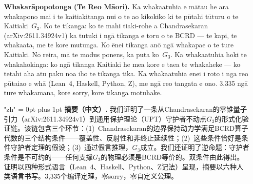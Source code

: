\documentclass[11pt,a4paper]{article}
\newenvironment{zhtext}{%
  \cjkfont
  \XeTeXlinebreaklocale "zh"%
  \XeTeXlinebreakskip = 0pt plus 1pt%
}{}
\theoremstyle{definition}
\theoremstyle{remark}
\begin{document}
\begin{center}
\parbox{0.85\textwidth}{\small\textbf{Whakar\={a}popotonga (Te Reo M\={a}ori).}
Ka whakaatuhia e m\={a}tau he ara whakapono mai i te kaitiakitanga nui o te ao kikokiko ki te p\={u}tahi t\={u}turu o te Kaitiaki~$G_3$. Ko te tikanga: ko te mahi tiaki-rohe a Chandrasekaran (arXiv:2611.34924v1) ka tutuki i ng\={a} tikanga e toru o te BCRD --- te kapi, te whakaata, me te kore mutunga. Ko \={e}nei tikanga an\={o} ng\={a} whakapae o te ture Kaitiaki. N\={o} reira, m\={a} te modus ponens, ka puta ko~$G_3$. Ka whakaatuhia hoki te whakahokinga: ko ng\={a} tikanga Kaitiaki he mea kore e taea te whakaheke --- ko t\={e}tahi aha atu paku noa iho te tikanga tika. Ka whakaatuhia \={e}nei i roto i ng\={a} reo p\={u}taiao e wh\={a} (Lean~4, Haskell, Python, Z), me ng\={a} reo tangata e ono. 3,335 ng\={a} ture whakamana, kore sorry, kore tikanga motuhake.}
\end{center}

\bigskip

\begin{center}
\parbox{0.85\textwidth}{\small\begin{zhtext}\textbf{摘要（中文）.}
我们证明了一条从Chandrasekaran的零锥量子引力（arXiv:2611.34924v1）到通用保护理论（UPT）守护者不动点$G_3$的形式化验证链。该链包含三个环节：(1)~Chandrasekaran的边界保持动力学满足BCRD算子代数的三个结构条件——覆盖性、反射性和非终止延续性；(2)~这些条件恰好是条件守护者定理的假设；(3)~通过假言推理，$G_3$成立。我们还证明了逆命题：守护者条件是不可约的——任何支撑$G_3$的物理必须是BCRD等价的。双条件由此得出。证明以四种形式语言（Lean~4、Haskell、Python、Z记法）呈现，摘要以六种人类语言书写。3,335个编译定理，零sorry，零自定义公理。\end{zhtext}}
\end{center}

\bigskip
\end{document}
